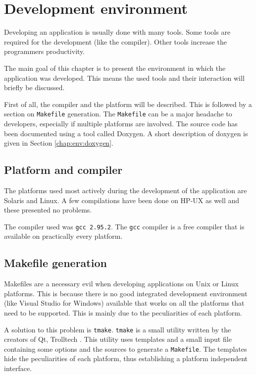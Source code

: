 
\chapter{Development environment} \label{chap:environment}
Developing an application is usually done with many tools. Some tools are
required for the development (like the compiler). Other tools increase the
programmers productivity.

\bigskip \noindent
The main goal of this chapter is to present the environment in which the
application was developed. This means the used tools and their interaction will
briefly be discussed.

\bigskip \noindent
First of all, the compiler and the platform will be described. This is followed
by a section on \verb=Makefile= generation. The \verb=Makefile= can be a major
headache to developers, especially if multiple platforms are involved. The
source code has been documented using a tool called Doxygen. A short
description of doxygen is given in Section \ref{chap:env:doxygen}.
\section{Platform and compiler}
The platforms used most actively during the development of the application are
Solaris and Linux. A few compilations have been done on HP-UX as well and these
presented no problems.

The compiler used was \verb=gcc 2.95.2=. The \verb=gcc= compiler is a free
compiler that is available on practically every platform.
\section{Makefile generation}
Makefiles are a necessary evil when developing applications on Unix or Linux
platforms. This is because there is no good integrated development environment
(like Visual Studio for Windows) available that works on all the platforms that
need to be supported. This is mainly due to the peculiarities of each platform.

A solution to this problem is \verb=tmake=. \verb=tmake= is a small utility
written by the creators of Qt, Trolltech \cite{Qt}. This utility uses templates
and a small input file containing some options and the sources to generate a
\verb=Makefile=. The templates hide the peculiarities of each platform, thus
establishing a platform independent interface.

